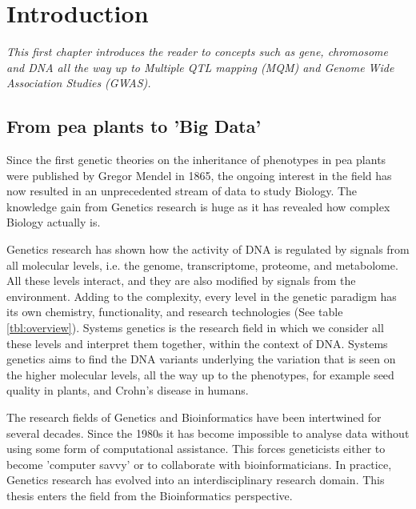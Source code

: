 \chapter{Introduction}
\thispagestyle{empty}
\label{chap:introduction}

\emph{This first chapter introduces the reader to concepts such as gene, chromosome 
and DNA all the way up to Multiple QTL mapping (MQM) and Genome Wide Association Studies 
(GWAS). }

\null
\vfill
\newpage

\section{From pea plants to 'Big Data'}
Since the first genetic theories on the inheritance of phenotypes in pea plants were published by 
Gregor Mendel in 1865, the ongoing interest in the field has now resulted in an unprecedented stream 
of data to study Biology. The knowledge gain from Genetics research is huge as it has revealed how 
complex Biology actually is. 

Genetics research has shown how the activity of DNA is regulated by signals from all molecular levels, 
i.e. the genome, transcriptome, proteome, and metabolome. All these levels interact, and they are also 
modified by signals from the environment. Adding to the complexity, every level in the genetic paradigm 
has its own chemistry, functionality, and research technologies (See table \ref{tbl:overview}). Systems 
genetics is the research field in which we consider all these levels and interpret them together, within 
the context of DNA. Systems genetics aims to find the DNA variants underlying the variation that is 
seen on the higher molecular levels, all the way up to the phenotypes, for example seed quality in plants, 
and Crohn's disease in humans. 

The research fields of Genetics and Bioinformatics have been intertwined for several decades. Since the 
1980s it has become impossible to analyse data without using some form of computational assistance. This 
forces geneticists either to become 'computer savvy' or to collaborate with bioinformaticians. In practice, 
Genetics research has evolved into an interdisciplinary research domain. This thesis enters the field from 
the Bioinformatics perspective.

